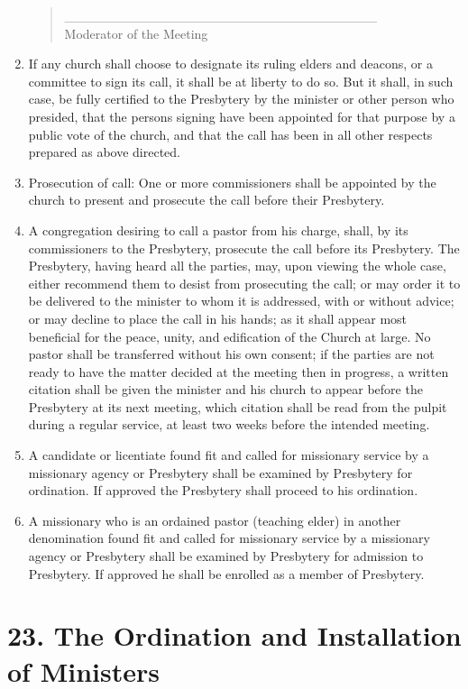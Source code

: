 \documentclass[
]{book}
\begin{document}
\begin{enumerate}
\begin{quote}
  \_\_\_\_\_\_\_\_\_\_\_\_\_\_\_\_\_\_\_\_\_\_\_\_\_\_\_\_\_\_\_\_\_\\
  Moderator of the Meeting
  \end{quote}
\item
  If any church shall choose to designate its ruling elders and deacons, or a committee to sign its call, it shall be at liberty to do so. But it shall, in such case, be fully certified to the Presbytery by the minister or other person who presided, that the persons signing have been appointed for that purpose by a public vote of the church, and that the call has been in all other respects prepared as above directed.
\item
  Prosecution of call: One or more commissioners shall be appointed by the church to present and prosecute the call before their Presbytery.
\item
  A congregation desiring to call a pastor from his charge, shall, by its commissioners to the Presbytery, prosecute the call before its Presbytery. The Presbytery, having heard all the parties, may, upon viewing the whole case, either recommend them to desist from prosecuting the call; or may order it to be delivered to the minister to whom it is addressed, with or without advice; or may decline to place the call in his hands; as it shall appear most beneficial for the peace, unity, and edification of the Church at large. No pastor shall be transferred without his own consent; if the parties are not ready to have the matter decided at the meeting then in progress, a written citation shall be given the minister and his church to appear before the Presbytery at its next meeting, which citation shall be read from the pulpit during a regular service, at least two weeks before the intended meeting.
\item
  A candidate or licentiate found fit and called for missionary service by a missionary agency or Presbytery shall be examined by Presbytery for ordination. If approved the Presbytery shall proceed to his ordination.
\item
  A missionary who is an ordained pastor (teaching elder) in another denomination found fit and called for missionary service by a missionary agency or Presbytery shall be examined by Presbytery for admission to Presbytery. If approved he shall be enrolled as a member of Presbytery.
\end{enumerate}

\hypertarget{the-ordination-and-installation-of-ministers}{%
\section*{23. The Ordination and Installation of Ministers}\label{the-ordination-and-installation-of-ministers}}
\end{document}
